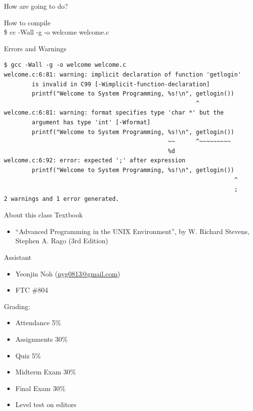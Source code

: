 \documentclass[newPxFont,sthlmFooter,nooffset]{beamer}
\begin{document}
\begin{frame}[t]{How are going to do?}


How to compile \\
\$ cc -Wall -g -o welcome welcome.c
\end{frame}

\begin{frame}[t,fragile]{Errors and Warnings}
\begin{lstlisting}
$ gcc -Wall -g -o welcome welcome.c
welcome.c:6:81: warning: implicit declaration of function 'getlogin' 
        is invalid in C99 [-Wimplicit-function-declaration]
        printf("Welcome to System Programming, %s!\n", getlogin())
                                                       ^
welcome.c:6:81: warning: format specifies type 'char *' but the 
        argument has type 'int' [-Wformat]
        printf("Welcome to System Programming, %s!\n", getlogin())
                                               ~~      ^~~~~~~~~~
                                               %d
welcome.c:6:92: error: expected ';' after expression
        printf("Welcome to System Programming, %s!\n", getlogin())
                                                                  ^
                                                                  ;
2 warnings and 1 error generated.
\end{lstlisting}


\end{frame}

\begin{frame}[t]{About this class}
Textbook
\begin{itemize}
	\item ``Advanced Programming in the UNIX Environment'', by
		W. Richard Stevens, Stephen A. Rago (3rd Edition)
\end{itemize}
\bigskip
Assistant
\begin{itemize}
	\item Yeonjin Noh (\href{mailto:nyg0813@gmail.com }{nyg0813@gmail.com})
	\item FTC \#804
\end{itemize}
\bigskip


\bigskip
Grading:
\vspace{-1em}
\begin{multicols}{2}
\begin{itemize}
	\item Attendance 5$\%$
	\item Assignments 30$\%$
	\item Quiz 5$\%$
	\item Midterm Exam 30$\%$
	\item Final Exam 30$\%$
	\item Level test on editors 
\end{itemize}
\end{multicols}
\end{frame}
\end{document}
